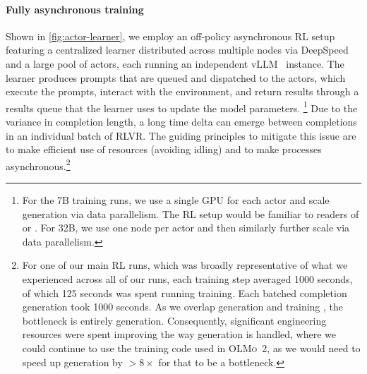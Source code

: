 \documentclass[table]{ai2style/ai2}
\newcommand{\oldOlmo}{OLMo\xspace}
\newcommand{\olmotoo}{\textsc{\oldOlmo~2}\xspace}
\begin{document}
\paragraph{Fully asynchronous training} Shown in \autoref{fig:actor-learner}, we employ an off-policy asynchronous RL setup \citep{noukhovitch2024asynchronousrlhffasterefficient} featuring a centralized learner distributed across multiple nodes via DeepSpeed~\citep{deepspeed} and a large pool of actors, each running an independent vLLM~\citep{vllm} instance.
The learner produces prompts that are queued and dispatched to the actors, which execute the prompts, interact with the environment, and return results through a results queue that the learner uses to update the model parameters.
\footnote{For the 7B training runs, we use a single GPU for each actor and scale generation via data parallelism.
The RL setup would be familiar to readers of \cite{horgan2018distributed} or \cite{silver2017alphazero}. For 32B, we use one node per actor and then similarly further scale via data parallelism.}
Due to the variance in completion length, a long time delta can emerge between completions in an individual batch of RLVR.
The guiding principles to mitigate this issue are to make efficient use of resources (avoiding idling) and to make processes asynchronous.\footnote{
For one of our main RL runs, which was broadly representative of what we experienced across all of our runs, each training step averaged 1000 seconds, of which 125 seconds was spent running training.
Each batched completion generation took 1000 seconds.
As we overlap generation and training \citep{noukhovitch2024asynchronousrlhffasterefficient}, the bottleneck is entirely generation.
Consequently, significant engineering resources were spent improving the way generation is handled, where we could continue to use the training code used in \olmotoo, as we would need to speed up generation by $>8\times$ for that to be a bottleneck. }
\end{document}
